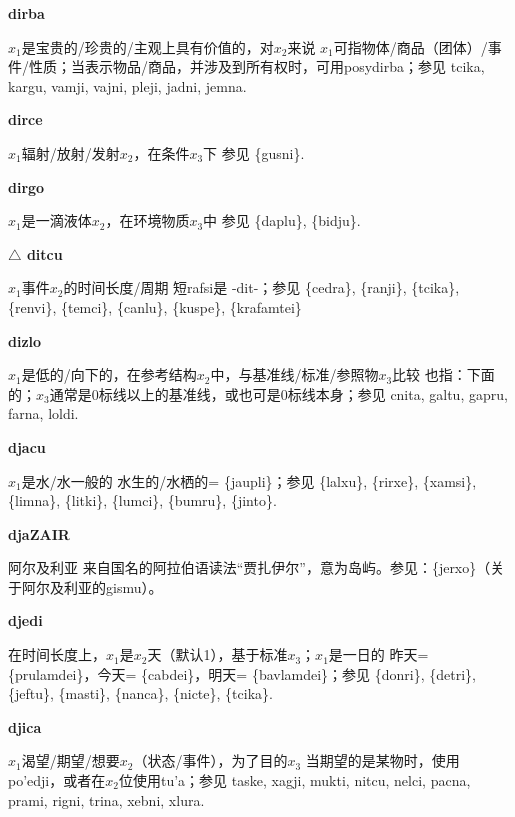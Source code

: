 \documentclass[notitlepage,twocolumn,a4paper,10pt]{book}
\begin{document}
{\sffamily\bfseries dirba}\enspace {\ttfamily\bfseries[dib]}  $x_1$是宝贵的\slash{}珍贵的\slash{}主观上具有价值的，对$x_2$来说 \textemdash{} $x_1$可指物体\slash{}商品（团体）\slash{}事件\slash{}性质；当表示物品\slash{}商品，并涉及到所有权时，可用{posydirba}；参见 {tcika}, {kargu}, {vamji}, {vajni}, {pleji}, {jadni}, {jemna}.

{\sffamily\bfseries dirce}\enspace {\ttfamily\bfseries[        di'e]}  $x_1$辐射\slash{}放射\slash{}发射$x_2$，在条件$x_3$下 \textemdash{} 参见 \{gusni\}.

{\sffamily\bfseries dirgo}\enspace {\ttfamily\bfseries[dig]}  $x_1$是一滴液体$x_2$，在环境物质$x_3$中 \textemdash{} 参见 \{daplu\}, \{bidju\}.

{\sffamily\bfseries $\triangle$ ditcu} $x_1$事件$x_2$的时间长度\slash{}周期 \textemdash{} 短rafsi是 -dit-；参见 \{cedra\}, \{ranji\}, \{tcika\}, \{renvi\}, \{temci\}, \{canlu\}, \{kuspe\}, \{krafamtei\}

{\sffamily\bfseries dizlo}  $x_1$是低的\slash{}向下的，在参考结构$x_2$中，与基准线\slash{}标准\slash{}参照物$x_3$比较 \textemdash{} 也指：下面的；$x_3$通常是0标线以上的基准线，或也可是0标线本身；参见 {cnita}, {galtu}, {gapru}, {farna}, {loldi}.

{\sffamily\bfseries djacu}  $x_1$是水\slash{}水一般的 \textemdash{} 水生的\slash{}水栖的= \{jaupli\}；参见 \{lalxu\}, \{rirxe\}, \{xamsi\}, \{limna\}, \{litki\}, \{lumci\}, \{bumru\}, \{jinto\}.

{\sffamily\bfseries djaZAIR} 阿尔及利亚 \textemdash{} 来自国名的阿拉伯语读法“贾扎伊尔”，意为岛屿。参见：\{jerxo\}（关于阿尔及利亚的gismu）。

{\sffamily\bfseries djedi}  在时间长度上，$x_1$是$x_2$天（默认1），基于标准$x_3$；$x_1$是一日的 \textemdash{} 昨天= \{prulamdei\}，今天= \{cabdei\}，明天= \{bavlamdei\}；参见 \{donri\}, \{detri\}, \{jeftu\}, \{masti\}, \{nanca\}, \{nicte\}, \{tcika\}.

{\sffamily\bfseries djica}\enspace {\ttfamily\bfseries[    dji]}  $x_1$渴望\slash{}期望\slash{}想要$x_2$（状态\slash{}事件），为了目的$x_3$ \textemdash{} 当期望的是某物时，使用po'edji，或者在$x_2$位使用tu'a；参见 {taske}, {xagji}, {mukti}, {nitcu}, {nelci}, {pacna}, {prami}, {rigni}, {trina}, {xebni}, {xlura}.
\end{document}

